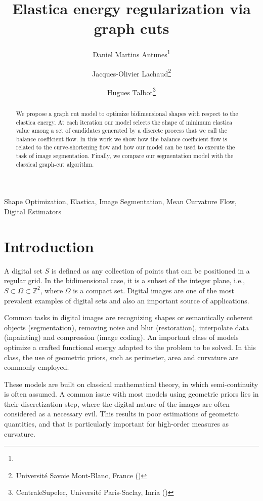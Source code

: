 \documentclass[review]{siamart220329}
\title{Elastica energy regularization via graph cuts}
\author{Daniel Martins Antunes\thanks{\email{danoan2008@gmail.com}}
\and Jacques-Olivier Lachaud\thanks{Universit\'e Savoie Mont-Blanc, France (\email{jacques-olivier.lachaud@univ-smb.fr})}
\and Hugues Talbot\thanks{CentraleSupelec, Universit\'e Paris-Saclay, Inria (\email{hugues.talbot@centralesupelec.fr})}}
\begin{document}
\maketitle

\begin{abstract}
We propose a graph cut model to optimize bidimensional shapes with respect to the elastica energy. At each iteration our model
selects the shape of minimum elastica value among a set of candidates generated by a discrete process that we call the balance 
coefficient flow. In this work we show how the balance coefficient flow is related to the curve-shortening flow and how our
model can be used to execute the task of image segmentation. Finally, we compare our segmentation model with the classical graph-cut algorithm. 
\end{abstract}

\begin{keywords}
Shape Optimization, Elastica, Image Segmentation, Mean Curvature Flow, Digital Estimators
\end{keywords}

\section{Introduction}

A digital set $S$ is defined as any collection of points that can be positioned in a regular grid. In the bidimensional case, it is a subset of the integer plane, i.e., $S \subset \Omega \subset \mathbb{Z}^2$, where $\Omega$ is a compact set. Digital images are one of the most prevalent examples of digital sets and also an important source of applications.

Common tasks in digital images are recognizing shapes or semantically coherent objects (segmentation), removing noise and blur (restoration), interpolate data (inpainting) and compression (image coding). An important class of models optimize a crafted functional energy adapted to the problem to be solved. In this class, the use of geometric priors, such as perimeter, area and curvature are commonly employed.

These models are built on classical mathematical theory, in which semi-continuity is often assumed. A common issue with most models using geometric priors lies in their discretization step, where the digital nature of the images are often considered as a necessary evil. This results in poor estimations of geometric quantities, and that is particularly important for high-order measures as curvature.
\end{document}
